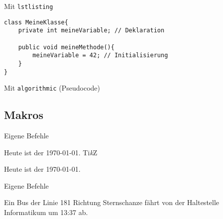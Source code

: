 \documentclass{beamer}
\begin{document}
		
		\begin{frame}[containsverbatim]{Mit \texttt{lstlisting}}
			\begin{lstlisting}[caption=Variablen]
class MeineKlasse{
	private int meineVariable; // Deklaration
	
	public void meineMethode(){
		meineVariable = 42; // Initialisierung
	}
}
			\end{lstlisting}
		\end{frame}
		

		\begin{frame}[containsverbatim]{Mit \texttt{algorithmic} (Pseudocode)}
		
		\end{frame}				
		
		
		\subsection{Makros}
		\begin{frame}[containsverbatim]{Eigene Befehle}
			\begin{latexcode}
\def\heute{Heute ist der \today.}
\newcommand{\heute}{Heute ist der \today.}
\newcommand{\TikZ}{Ti\textit{k}Z}
\heute
\TikZ
			\end{latexcode}
			Heute ist der \today.\\
			\TikZ
		\end{frame}
		
		
		\begin{frame}[containsverbatim]{Eigene Befehle}
			\begin{latexcode}
\newcommand{\bus}[4]{Ein Bus der Linie #1 Richtung 
                    #2 fährt von der Haltestelle
                    #3 um #4 ab.}
\bus{181}{Sternschanze}{Informatikum}{13:37}
			\end{latexcode}
		\end{frame}
		
\end{document}
